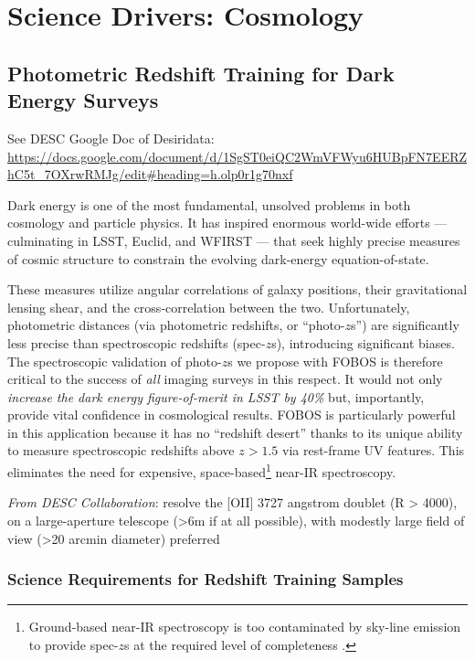 \documentclass[preprint,11pt]{aastex}
\begin{document}
\section{Science Drivers: Cosmology} \label{sci:cosmology}

\subsection{Photometric Redshift Training for Dark Energy Surveys}
\label{sci:photoz}

See DESC Google Doc of Desiridata: \url{https://docs.google.com/document/d/1SgST0eiQC2WmVFWyu6HUBpFN7EERZhC5t\_7OXrwRMJg/edit\#heading=h.olp0r1g70nxf}

Dark energy is one of
the most fundamental, unsolved problems in both cosmology and particle
physics.  It has inspired enormous world-wide efforts --- culminating in
LSST, Euclid, and WFIRST --- that seek highly precise measures of cosmic
structure to constrain the evolving dark-energy equation-of-state.

These measures utilize angular correlations of galaxy positions, their
gravitational lensing shear, and the cross-correlation between the two.
Unfortunately, photometric distances (via photometric redshifts, or
``photo-$z$s'') are significantly less precise than spectroscopic
redshifts (spec-$z$s), introducing significant biases.  The
spectroscopic validation of photo-$z$s we propose with FOBOS is
therefore critical to the success of {\it all} imaging surveys in this
respect. It would not only \emph{increase the dark energy
figure-of-merit in LSST by 40\%} \citep{newman15} but, importantly,
provide vital confidence in cosmological results.  FOBOS is particularly
powerful in this application because it has no ``redshift desert'' thanks to its unique ability to measure spectroscopic redshifts above $z > 1.5$ via
rest-frame UV features.  This eliminates the need for expensive, space-based\footnote{Ground-based near-IR
spectroscopy is too contaminated by sky-line emission to provide spec-$z$s at the required level of completeness
\citep{newman15}.} near-IR spectroscopy.


\emph{From DESC Collaboration}: resolve the [OII] 3727 angstrom doublet (R > 4000), on a large-aperture telescope (>6m if at all possible), with modestly large field of view (>20 arcmin diameter) preferred


\subsubsection{Science Requirements for Redshift Training Samples}
\end{document}
